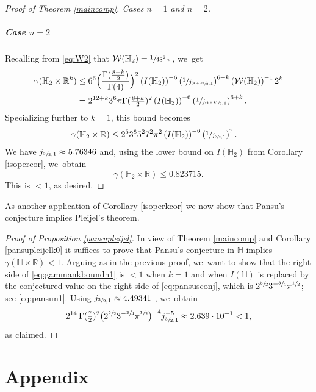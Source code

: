 \documentclass[11pt]{article}
\let\oldsfrac\sfrac
\renewcommand{\sfrac}[2]{{\oldsfrac{#1}{#2}}}
\newcommand{\psfrac}[2]{{\sfrac{(#1)}{#2}}}
\theoremstyle{definition}
\newcommand{\1}{\mathbbm{1}}
\newcommand{\R}{\mathbb{R}}
\numberwithin{equation}{section}
\begin{document}
\begin{proof}[Proof of Theorem \ref{maincomp}. Cases $n\!=\!1$ and $n\!=\!2$]
\subsubsection*{Case $n=2$} Recalling from \eqref{eq:W2} that $\mathcal W(\mathbb H_2) = \sfrac{1}{48^2\,\pi}$, we~get
\begin{align*}
\gamma(\mathbb H_2\times\R^k)
& \leq
6^6 \Bigl(\frac{\Gamma(\frac{8+k}{2})}{\Gamma(4)}\Bigr)^2
\left(I(\mathbb H_2)\right)^{-6} \left(\sfrac{1}{j_{\psfrac{4+k}{2},1}}\right)^{6+k}
\left(\mathcal W(\mathbb H_2)\right)^{-1} 2^k \\
& = 2^{12+k} 3^6 \pi \Gamma(\tfrac{8+k}{2})^2 \left(I(\mathbb H_2)\right)^{-6} \left(\sfrac{1}{j_{\psfrac{4+k}{2},1}}\right)^{6+k}.
\end{align*}
Specializing further to $k=1$, this bound becomes
\begin{align*}
\gamma(\mathbb H_2\times\R)
& \leq 2^{5} 3^8 5^2 7^2 \pi^2 \left(I(\mathbb H_2)\right)^{-6} \left(\sfrac{1}{j_{\sfrac{5}{2},1}}\right)^{7}.
\end{align*}
We have $j_{\sfrac52,1}\approx 5.76346$ \cite[Table\,10.6]{AbSt} and, using the lower bound on $I(\mathbb H_2)$ from Corollary \ref{isopercor}, we~obtain
\[
\gamma(\mathbb H_2\times\R) \leq 0.823715.
\]
This is $<1$, as desired.
\end{proof}

As another application of Corollary \ref{isoperkcor} we now show that Pansu's conjecture implies Pleijel's theorem.

\begin{proof}[Proof of Proposition \ref{pansupleijel}]
In view of Theorem \ref{maincomp} and Corollary \ref{pansupleijelk0} it suffices to prove that Pansu's conjecture in $\mathbb H$ implies $\gamma(\mathbb H\times\R)<1$. Arguing as in the previous proof, we~want to show that the right side of \eqref{eq:gammankboundn1} is $<1$ when $k=1$ and when $I(\mathbb H)$ is replaced by the conjectured value on the right side of \eqref{eq:pansusconj}, which is $2^{\sfrac 52} 3^{-\sfrac 34}\pi^{\sfrac 12}$; see \eqref{eq:pansun1}. Using $j_{\sfrac32,1}\approx 4.49341$ \cite[Table\,10.6]{AbSt}, we~obtain
\[
2^{14} \,\Gamma(\tfrac 72)^2 \bigl(2^{\sfrac 52} 3^{-\sfrac 34}\pi^{\sfrac 12}\bigr)^{-4} j_{\sfrac32,1}^{-5} \approx 2.639 \cdot 10^{-1} <1,
\]
as claimed.
\end{proof}

\appendix

\part{Appendix}
\end{document}
